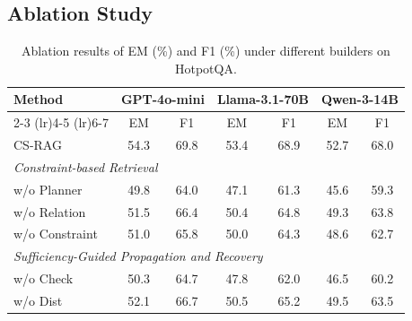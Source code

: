 \documentclass{article}
\theoremstyle{plain}
\theoremstyle{definition}
\theoremstyle{remark}
\begin{document}


\subsection{Ablation Study}
\label{sec:ablation}

\begin{table}
\vspace{-0.0em}
    \centering
    \scriptsize
    \setlength{\tabcolsep}{2pt}
    \caption{Ablation results of EM (\%) and F1 (\%) under different builders on HotpotQA.}
    \label{tab:ablation_main}
    \begin{tabular}{lcccccc}
        \toprule
        \multirow{2}{*}{Method} &
        \multicolumn{2}{c}{\textbf{GPT-4o-mini}} &
        \multicolumn{2}{c}{\textbf{Llama-3.1-70B}} &
        \multicolumn{2}{c}{\textbf{Qwen-3-14B}} \\
        \cmidrule(lr){2-3} \cmidrule(lr){4-5} \cmidrule(lr){6-7}
        & EM & F1 & EM & F1 & EM & F1 \\
        \midrule
        CS-RAG & 54.3 & 69.8 & 53.4 & 68.9 & 52.7 & 68.0 \\
        \midrule
        \multicolumn{7}{l}{\textit{Constraint-based Retrieval}} \\
        w/o Planner & 49.8 & 64.0 & 47.1 & 61.3 & 45.6 & 59.3 \\
        w/o Relation & 51.5 & 66.4 & 50.4 & 64.8 & 49.3 & 63.8 \\
        w/o Constraint & 51.0 & 65.8 & 50.0 & 64.3 & 48.6 & 62.7 \\
        \midrule
        \multicolumn{7}{l}{\textit{Sufficiency-Guided Propagation and Recovery}} \\
        w/o Check & 50.3 & 64.7 & 47.8 & 62.0 & 46.5 & 60.2 \\
        w/o Dist & 52.1 & 66.7 & 50.5 & 65.2 & 49.5 & 63.5 \\
        \bottomrule
    \end{tabular}
    \vspace{-0.0em}
\end{table}
\end{document}
